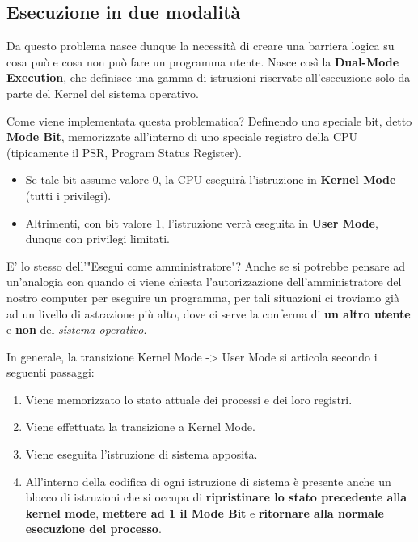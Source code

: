 \documentclass[12pt]{report}
\begin{document}
	\subsection{Esecuzione in due modalità}
	Da questo problema nasce dunque la necessità di creare una barriera logica su cosa può e cosa non può fare un programma utente. Nasce così la \textbf{Dual-Mode Execution}, che definisce una gamma di istruzioni riservate all'esecuzione solo da parte del Kernel del sistema operativo.
	
	Come viene implementata questa problematica? Definendo uno speciale bit, detto \textbf{Mode Bit}, memorizzate all'interno di uno speciale registro della CPU (tipicamente il PSR, Program Status Register).
	\begin{itemize}
		\item Se tale bit assume valore 0, la CPU eseguirà l'istruzione in \textbf{Kernel Mode} (tutti i privilegi).
		
		\item Altrimenti, con bit valore 1, l'istruzione verrà eseguita in \textbf{User Mode}, dunque con privilegi limitati.
	\end{itemize}
	
	\begin{osservazione}{E' lo stesso dell'"Esegui come amministratore"?}{}
		Anche se si potrebbe pensare ad un'analogia con quando ci viene chiesta l'autorizzazione dell'amministratore del nostro computer per eseguire un programma, per tali situazioni ci troviamo già ad un livello di astrazione più alto, dove ci serve la conferma di \textbf{un altro utente} e \textbf{non} del \textit{sistema operativo}.
	\end{osservazione}
	
	In generale, la transizione Kernel Mode -> User Mode si articola secondo i seguenti passaggi:
	\begin{enumerate}
		\item Viene memorizzato lo stato attuale dei processi e dei loro registri.
		
		\item Viene effettuata la transizione a Kernel Mode.
		
		\item Viene eseguita l'istruzione di sistema apposita.
		
		\item All'interno della codifica di ogni istruzione di sistema è presente anche un blocco di istruzioni che si occupa di \textbf{ripristinare lo stato precedente alla kernel mode}, \textbf{mettere ad 1 il Mode Bit} e \textbf{ritornare alla normale esecuzione del processo}.
	\end{enumerate}
	
\end{document}
